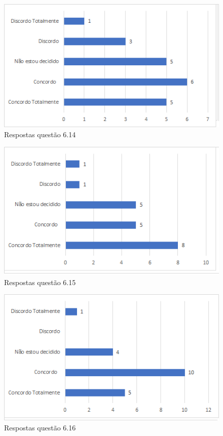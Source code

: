 \begin{figure}[!t]
\centering
\includegraphics[scale=0.7]{figuras das questoes/6.14.png}
\caption{Respostas questão 6.14}
\end{figure}

\begin{figure}[!t]
\centering
\includegraphics[scale=0.7]{figuras das questoes/6.15.png}
\caption{Respostas questão 6.15}
\end{figure}

\begin{figure}[!t]
\centering
\includegraphics[scale=0.7]{figuras das questoes/6.16.png}
\caption{Respostas questão 6.16}
\end{figure}

